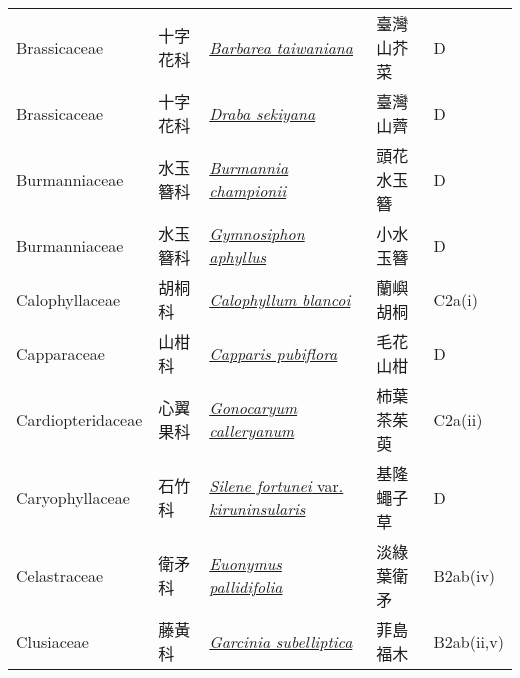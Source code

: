 {\begin{longtable}{p{2.5cm}p{2.5cm}p{4.5cm}p{2.5cm}p{3cm}}
    Brassicaceae & 十字花科 & \href{http://www.theplantlist.org/tpl1.1/search?q=Barbarea+taiwaniana}{\textit{Barbarea taiwaniana} } & 臺灣山芥菜 & D \index{Barbarea@\textit{Barbarea}!taiwaniana@\textit{taiwaniana}}  \index{臺灣山芥菜} \\
    Brassicaceae & 十字花科 & \href{http://www.theplantlist.org/tpl1.1/search?q=Draba+sekiyana}{\textit{Draba sekiyana} } & 臺灣山薺 & D \index{Draba@\textit{Draba}!sekiyana@\textit{sekiyana}}  \index{臺灣山薺} \\
    Burmanniaceae & 水玉簪科 & \href{http://www.theplantlist.org/tpl1.1/search?q=Burmannia+championii}{\textit{Burmannia championii} } & 頭花水玉簪 & D \index{Burmannia@\textit{Burmannia}!championii@\textit{championii}}  \index{頭花水玉簪} \\
    Burmanniaceae & 水玉簪科 & \href{http://www.theplantlist.org/tpl1.1/search?q=Gymnosiphon+aphyllus}{\textit{Gymnosiphon aphyllus} } & 小水玉簪 & D \index{Gymnosiphon@\textit{Gymnosiphon}!aphyllus@\textit{aphyllus}}  \index{小水玉簪} \\
    Calophyllaceae & 胡桐科 & \href{http://www.theplantlist.org/tpl1.1/search?q=Calophyllum+blancoi}{\textit{Calophyllum blancoi} } & 蘭嶼胡桐 & C2a(i) \index{Calophyllum@\textit{Calophyllum}!blancoi@\textit{blancoi}}  \index{蘭嶼胡桐} \\
    Capparaceae & 山柑科 & \href{http://www.theplantlist.org/tpl1.1/search?q=Capparis+pubiflora}{\textit{Capparis pubiflora} } & 毛花山柑 & D \index{Capparis@\textit{Capparis}!pubiflora@\textit{pubiflora}}  \index{毛花山柑} \\
    Cardiopteridaceae & 心翼果科 & \href{http://www.theplantlist.org/tpl1.1/search?q=Gonocaryum+calleryanum}{\textit{Gonocaryum calleryanum} } & 柿葉茶茱萸 & C2a(ii) \index{Gonocaryum@\textit{Gonocaryum}!calleryanum@\textit{calleryanum}}  \index{柿葉茶茱萸} \\
    Caryophyllaceae & 石竹科 & \href{http://www.theplantlist.org/tpl1.1/search?q=Silene+fortunei+var.+kiruninsularis}{\textit{Silene fortunei} var. \textit{kiruninsularis} } & 基隆蠅子草 & D \index{Silene@\textit{Silene}!fortunei@\textit{fortunei}!var. kiruninsularis@var. \textit{kiruninsularis}}  \index{基隆蠅子草} \\
    Celastraceae & 衛矛科 & \href{http://www.theplantlist.org/tpl1.1/search?q=Euonymus+pallidifolia}{\textit{Euonymus pallidifolia} } & 淡綠葉衛矛 & B2ab(iv) \index{Euonymus@\textit{Euonymus}!pallidifolia@\textit{pallidifolia}}  \index{淡綠葉衛矛} \\
    Clusiaceae & 藤黃科 & \href{http://www.theplantlist.org/tpl1.1/search?q=Garcinia+subelliptica}{\textit{Garcinia subelliptica} } & 菲島福木 & B2ab(ii,v) \index{Garcinia@\textit{Garcinia}!subelliptica@\textit{subelliptica}}  \index{菲島福木} \\

\end{longtable}}
